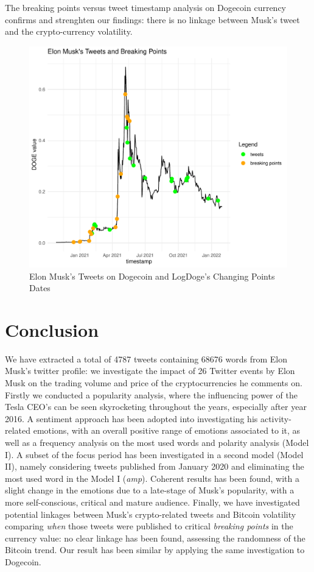 \documentclass[
]{article}
\begin{document}
The breaking points versus tweet timestamp analysis on Dogecoin currency
confirms and strenghten our findings: there is no linkage between Musk's
tweet and the crypto-currency volatility.

\begin{figure}
\centering
\includegraphics{Trial1_files/figure-latex/fig21-1.pdf}
\caption{\label{fig:fig21}Elon Musk's Tweets on Dogecoin and LogDoge's
Changing Points Dates}
\end{figure}

\hypertarget{conclusion}{%
\section{Conclusion}\label{conclusion}}

We have extracted a total of 4787 tweets containing 68676 words from
Elon Musk's twitter profile: we investigate the impact of 26 Twitter
events by Elon Musk on the trading volume and price of the
cryptocurrencies he comments on. Firstly we conducted a popularity
analysis, where the influencing power of the Tesla CEO's can be seen
skyrocketing throughout the years, especially after year 2016. A
sentiment approach has been adopted into investigating his
activity-related emotions, with an overall positive range of emotions
associated to it, as well as a frequency analysis on the most used words
and polarity analysis (Model I). A subset of the focus period has been
investigated in a second model (Model II), namely considering tweets
published from January 2020 and eliminating the most used word in the
Model I (\emph{amp}). Coherent results has been found, with a slight
change in the emotions due to a late-stage of Musk's popularity, with a
more self-conscious, critical and mature audience. Finally, we have
investigated potential linkages between Musk's crypto-related tweets and
Bitcoin volatility comparing \emph{when} those tweets were published to
critical \emph{breaking points} in the currency value: no clear linkage
has been found, assessing the randomness of the Bitcoin trend. Our
result has been similar by applying the same investigation to Dogecoin.
\end{document}
